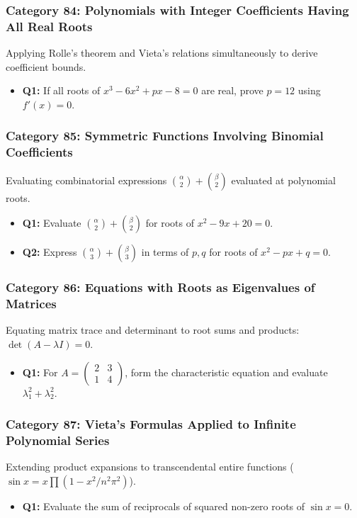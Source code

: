 \documentclass[10pt,a4paper]{article}
\begin{document}
\subsubsection{Category 84: Polynomials with Integer Coefficients Having All Real Roots}
Applying Rolle's theorem and Vieta's relations simultaneously to derive coefficient bounds.
\begin{itemize}[leftmargin=*]
    \item \textbf{Q1:} If all roots of $x^3 - 6x^2 + px - 8 = 0$ are real, prove $p = 12$ using $f'(x) = 0$.
\end{itemize}

\subsubsection{Category 85: Symmetric Functions Involving Binomial Coefficients}
Evaluating combinatorial expressions $\binom{\alpha}{2} + \binom{\beta}{2}$ evaluated at polynomial roots.
\begin{itemize}[leftmargin=*]
    \item \textbf{Q1:} Evaluate $\binom{\alpha}{2} + \binom{\beta}{2}$ for roots of $x^2 - 9x + 20 = 0$.
    \item \textbf{Q2:} Express $\binom{\alpha}{3} + \binom{\beta}{3}$ in terms of $p, q$ for roots of $x^2 - px + q = 0$.
\end{itemize}

\subsubsection{Category 86: Equations with Roots as Eigenvalues of Matrices}
Equating matrix trace and determinant to root sums and products: $\det(A - \lambda I) = 0$.
\begin{itemize}[leftmargin=*]
    \item \textbf{Q1:} For $A = \begin{pmatrix} 2 & 3 \\ 1 & 4 \end{pmatrix}$, form the characteristic equation and evaluate $\lambda_1^2 + \lambda_2^2$.
\end{itemize}

\subsubsection{Category 87: Vieta's Formulas Applied to Infinite Polynomial Series}
Extending product expansions to transcendental entire functions ($\sin x = x \prod (1 - x^2/n^2\pi^2)$).
\begin{itemize}[leftmargin=*]
    \item \textbf{Q1:} Evaluate the sum of reciprocals of squared non-zero roots of $\sin x = 0$.
\end{itemize}
\end{document}
